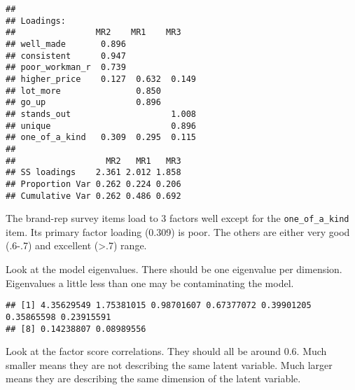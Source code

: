 \documentclass[
]{book}
\newenvironment{Shaded}{\begin{snugshade}}{\end{snugshade}}
\newcommand{\NormalTok}[1]{#1}
\newcommand{\SpecialCharTok}[1]{\textcolor[rgb]{0.00,0.00,0.00}{#1}}
\theoremstyle{definition}
\theoremstyle{definition}
\theoremstyle{definition}
\theoremstyle{definition}
\theoremstyle{remark}
\begin{document}
\begin{Shaded}
\end{Shaded}

\begin{verbatim}
## 
## Loadings:
##                MR2    MR1    MR3   
## well_made       0.896              
## consistent      0.947              
## poor_workman_r  0.739              
## higher_price    0.127  0.632  0.149
## lot_more               0.850       
## go_up                  0.896       
## stands_out                    1.008
## unique                        0.896
## one_of_a_kind   0.309  0.295  0.115
## 
##                  MR2   MR1   MR3
## SS loadings    2.361 2.012 1.858
## Proportion Var 0.262 0.224 0.206
## Cumulative Var 0.262 0.486 0.692
\end{verbatim}

The brand-rep survey items load to 3 factors well except for the \texttt{one\_of\_a\_kind} item. Its primary factor loading (0.309) is poor. The others are either very good (.6-.7) and excellent (\textgreater.7) range.

Look at the model eigenvalues. There should be one eigenvalue per dimension. Eigenvalues a little less than one may be contaminating the model.

\begin{Shaded}
\end{Shaded}

\begin{verbatim}
## [1] 4.35629549 1.75381015 0.98701607 0.67377072 0.39901205 0.35865598 0.23915591
## [8] 0.14238807 0.08989556
\end{verbatim}

Look at the factor score correlations. They should all be around 0.6. Much smaller means they are not describing the same latent variable. Much larger means they are describing the same dimension of the latent variable.

\begin{Shaded}
\end{Shaded}
\end{document}
